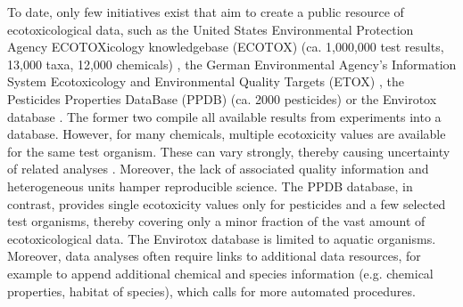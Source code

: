 \documentclass[journal,datadescriptor,accept,moreauthors,pdftex]{Definitions/mdpi}
\begin{document}
To date, only few initiatives exist that aim to create a public resource of ecotoxicological data, such as the United States Environmental Protection Agency ECOTOXicology knowledgebase (ECOTOX) (ca. 1,000,000 test results, 13,000 taxa, 12,000 chemicals) \citep{elonen_ecotoxicology_2018}, the German Environmental Agency's Information System Ecotoxicology and Environmental Quality Targets (ETOX) \citep{umweltbundesamt_etox_2019}, the Pesticides Properties DataBase (PPDB) (ca. 2000 pesticides) \citep{lewis_international_2016} or the Envirotox database \citep{healthandenvironmentalsciencesinstitutehesi_envirotox_2019, connors_creation_2019}. The former two compile all available results from experiments into a database. However, for many chemicals, multiple ecotoxicity values are available for the same test organism. These  can vary strongly, thereby causing uncertainty of related analyses \citep{mark_analysis_1998, malaj_physiological_2012}. Moreover, the lack of associated quality information and heterogeneous units hamper reproducible science. The PPDB database, in contrast, provides single ecotoxicity values only for pesticides and a few selected test organisms, thereby covering only a minor fraction of the vast amount of ecotoxicological data. The Envirotox database is limited to aquatic organisms. Moreover, data analyses often require links to additional data resources, for example to append additional chemical and species information (e.g. chemical properties, habitat of species), which calls for more automated procedures. 
\end{document}
